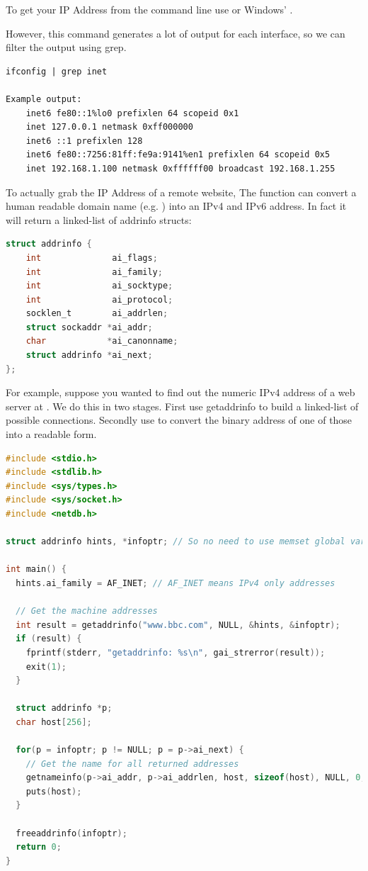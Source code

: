 To get your IP Address from the command line use  or Windows' .

However, this command generates a lot of output for each interface, so we can filter the output using grep.

\begin{lstlisting}
ifconfig | grep inet

Example output:
    inet6 fe80::1%lo0 prefixlen 64 scopeid 0x1
    inet 127.0.0.1 netmask 0xff000000
    inet6 ::1 prefixlen 128
    inet6 fe80::7256:81ff:fe9a:9141%en1 prefixlen 64 scopeid 0x5
    inet 192.168.1.100 netmask 0xffffff00 broadcast 192.168.1.255
\end{lstlisting}

To actually grab the IP Address of a remote website, The function  can convert a human readable domain name (e.g. ) into an IPv4 and IPv6 address.
In fact it will return a linked-list of addrinfo structs:

\begin{lstlisting}[language=C]
struct addrinfo {
    int              ai_flags;
    int              ai_family;
    int              ai_socktype;
    int              ai_protocol;
    socklen_t        ai_addrlen;
    struct sockaddr *ai_addr;
    char            *ai_canonname;
    struct addrinfo *ai_next;
};
\end{lstlisting}

For example, suppose you wanted to find out the numeric IPv4 address of a web server at .
We do this in two stages.
First use getaddrinfo to build a linked-list of possible connections.
Secondly use  to convert the binary address of one of those into a readable form.

\begin{lstlisting}[language=C]
#include <stdio.h>
#include <stdlib.h>
#include <sys/types.h>
#include <sys/socket.h>
#include <netdb.h>

struct addrinfo hints, *infoptr; // So no need to use memset global variables

int main() {
  hints.ai_family = AF_INET; // AF_INET means IPv4 only addresses

  // Get the machine addresses
  int result = getaddrinfo("www.bbc.com", NULL, &hints, &infoptr);
  if (result) {
    fprintf(stderr, "getaddrinfo: %s\n", gai_strerror(result));
    exit(1);
  }

  struct addrinfo *p;
  char host[256];

  for(p = infoptr; p != NULL; p = p->ai_next) {
    // Get the name for all returned addresses
    getnameinfo(p->ai_addr, p->ai_addrlen, host, sizeof(host), NULL, 0, NI_NUMERICHOST);
    puts(host);
  }

  freeaddrinfo(infoptr);
  return 0;
}
\end{lstlisting}

